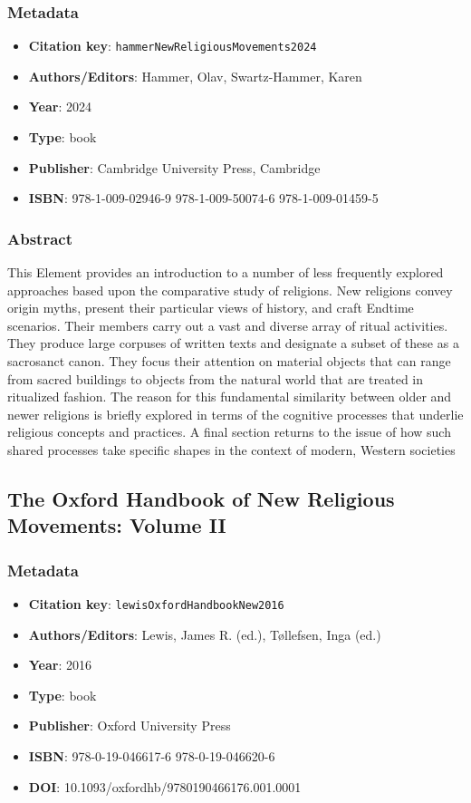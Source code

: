 \subsubsection*{Metadata}
\begin{itemize}
  \item \textbf{Citation key}: \texttt{hammerNewReligiousMovements2024}
  \item \textbf{Authors/Editors}: Hammer, Olav, Swartz-Hammer, Karen
  \item \textbf{Year}: 2024
  \item \textbf{Type}: book
  \item \textbf{Publisher}: Cambridge University Press, Cambridge
  \item \textbf{ISBN}: 978-1-009-02946-9 978-1-009-50074-6 978-1-009-01459-5
\end{itemize}
\subsubsection*{Abstract}
This Element provides an introduction to a number of less frequently explored approaches based upon the comparative study of religions. New religions convey origin myths, present their particular views of history, and craft Endtime scenarios. Their members carry out a vast and diverse array of ritual activities. They produce large corpuses of written texts and designate a subset of these as a sacrosanct canon. They focus their attention on material objects that can range from sacred buildings to objects from the natural world that are treated in ritualized fashion. The reason for this fundamental similarity between older and newer religions is briefly explored in terms of the cognitive processes that underlie religious concepts and practices. A final section returns to the issue of how such shared processes take specific shapes in the context of modern, Western societies

\subsection{The Oxford Handbook of New Religious Movements: Volume II}\label{lit:lewisOxfordHandbookNew2016}
\subsubsection*{Metadata}
\begin{itemize}
  \item \textbf{Citation key}: \texttt{lewisOxfordHandbookNew2016}
  \item \textbf{Authors/Editors}: Lewis, James R. (ed.), Tøllefsen, Inga (ed.)
  \item \textbf{Year}: 2016
  \item \textbf{Type}: book
  \item \textbf{Publisher}: Oxford University Press
  \item \textbf{ISBN}: 978-0-19-046617-6 978-0-19-046620-6
  \item \textbf{DOI}: 10.1093/oxfordhb/9780190466176.001.0001
\end{itemize}
